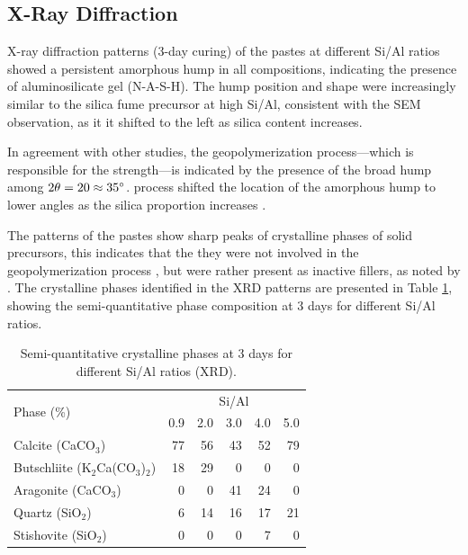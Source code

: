 \subsection{X-Ray Diffraction}

X-ray diffraction patterns (3-day curing) of the pastes at different Si/Al ratios showed a persistent amorphous hump in all compositions, indicating the presence of aluminosilicate gel (N-A-S-H).
The hump position and shape were increasingly similar to the silica fume precursor at high Si/Al, consistent with the SEM observation, as it it shifted to the left as silica content increases. 

In agreement with other studies, the geopolymerization process—which is responsible for the strength—is indicated by the presence of the broad hump among $2\theta = 20 \approx 35^{\circ}$.
process shifted the location of the amorphous hump to lower angles as the silica proportion increases \cite{arellano2014geopolymer,lee2017strength, wan2017geopolymerization}.

The patterns of the pastes show sharp peaks of crystalline phases of solid precursors, this indicates that the they were not involved in the geopolymerization process \cite{Geraldo2020}, but were rather present as inactive fillers, as noted by \cite{ruiz2012alkaline}.
The crystalline phases identified in the XRD patterns are presented in Table \ref{tab:xrd_phases_pastes}, showing the semi-quantitative phase composition at 3 days for different Si/Al ratios.

\begin{table}[H]
    \centering
    \caption{Semi-quantitative crystalline phases at 3 days for different Si/Al ratios (XRD).}
    \label{tab:xrd_phases_pastes}
    \begin{tabular}{lrrrrr}
        \hline
        \multirow{2}{*}{Phase (\%)} &
        \multicolumn{5}{c}{Si/Al}\\
        \cline{2-6}
        & 0.9 & 2.0 & 3.0 & 4.0 & 5.0 \\
        \hline
        Calcite (CaCO$_3$) & 77 & 56 & 43 & 52 & 79 \\
        Butschliite (K$_2$Ca(CO$_3$)$_2$) & 18 & 29 & 0 & 0 & 0 \\
        Aragonite (CaCO$_3$) & 0 & 0 & 41 & 24 & 0 \\
        Quartz (SiO$_2$) & 6 & 14 & 16 & 17 & 21 \\
        Stishovite (SiO$_2$) & 0 & 0 & 0 & 7 & 0 \\
        \hline
    \end{tabular}
\end{table}


